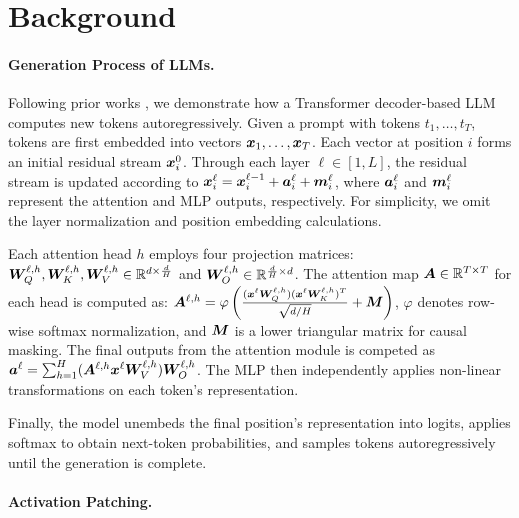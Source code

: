 \section{Background}

\paragraph{Generation Process of LLMs.}
\label{para:forward}
Following prior works \cite{elhage2021mathematical, geva2023dissecting}, we demonstrate how a Transformer \cite{vaswani2017attention} decoder-based LLM computes new tokens autoregressively.
Given a prompt with tokens \(t_1,\dots,t_T\), tokens are first embedded into vectors \({\bm{x}}_1,\dots,{\bm{x}}_T\).
Each vector at position \(i\) forms an initial residual stream \({\bm{x}}^{0}_i\).
Through each layer \(\ell\in[1,L]\), the residual stream is updated according to \({\bm{x}}^{\ell}_i = {\bm{x}}^{\ell-1}_i + {\bm{a}}^{\ell}_i + {\bm{m}}^{\ell}_i\), where \({\bm{a}}^{\ell}_i\) and \({\bm{m}}^{\ell}_i\) represent the attention and MLP outputs, respectively.
For simplicity, we omit the layer normalization and position embedding calculations.

Each attention head \(h\) employs four projection matrices: \({\bm{W}}^{\ell,h}_Q, {\bm{W}}^{\ell,h}_K, {\bm{W}}^{\ell,h}_V \in \mathbb{R}^{d \times \frac{d}{H}}\) and \({\bm{W}}^{\ell,h}_O \in \mathbb{R}^{\frac{d}{H} \times d}\). The attention map \( {\bm{A}} \in \mathbb{R}^{T \times T}\) for each head is computed as: 
\(
{\bm{A}}^{\ell,h} = \varphi\left( \frac{ ({\bm{x}}^\ell{\bm{W}}^{\ell,h}_Q)({\bm{x}}^\ell{\bm{W}}^{\ell,h}_K)^{T} }{\sqrt{d/H}} + {\bm{M}} \right)
\), \(\varphi\) denotes row-wise softmax normalization, and \({\bm{M}}\) is a lower triangular matrix for causal masking.
The final outputs from the attention module is competed as \({\bm{a}}^\ell = \sum_{h=1}^H ({\bm{A}}^{\ell,h}{\bm{x}}^\ell{\bm{W}}^{\ell,h}_V){\bm{W}}^{\ell,h}_O\).
The MLP then independently applies non-linear transformations on each token's representation.

Finally, the model unembeds the final position's representation into logits, applies softmax to obtain next-token probabilities, and samples tokens autoregressively until the generation is complete.


\paragraph{Activation Patching.}
\label{para:patching}

